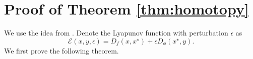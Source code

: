 \documentclass{article}
\theoremstyle{plain}
\theoremstyle{definition}
\theoremstyle{remark}
\begin{document}
\section{Proof of Theorem \ref{thm:homotopy}}
\label{sec:homotopy_proof}

We use the idea from \citet{chen2025accelerated}. Denote the Lyapunov function with perturbation $\epsilon$ as
\begin{equation}\label{eq:perturbed Lyapunov}
\mathcal{E}(x, y, \epsilon) = D_f(x, x^{\star}) + \epsilon D_\phi(x^\star,y).\end{equation}
We first prove the following theorem.
\end{document}
